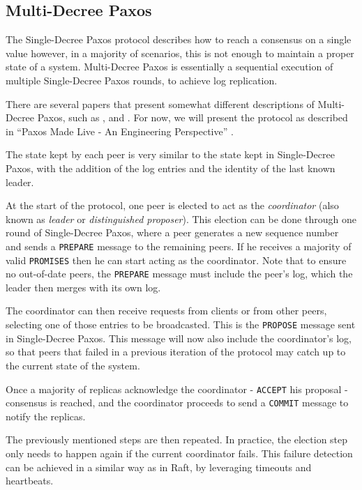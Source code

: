 \subsection{Multi-Decree Paxos}

The Single-Decree Paxos protocol describes how to reach a consensus on a single value however, in a majority of scenarios, this is not enough to maintain a proper state of a system. Multi-Decree Paxos is essentially a sequential execution of multiple Single-Decree Paxos rounds, to achieve log replication. 

There are several papers that present somewhat different descriptions of Multi-Decree Paxos, such as \cite{paxos_complex}, \cite{paxos_live} and \cite{paxos_vs_raft}. For now, we will present the protocol as described in “Paxos Made Live - An Engineering Perspective” \cite{paxos_live}.

The state kept by each peer is very similar to the state kept in Single-Decree Paxos, with the addition of the log entries and the identity of the last known leader.

At the start of the protocol, one peer is elected to act as the \textit{coordinator} (also known as \textit{leader} or \textit{distinguished proposer}). This election can be done through one round of Single-Decree Paxos, where a peer generates a new sequence number and sends a \texttt{PREPARE} message to the remaining peers. If he receives a majority of valid \texttt{PROMISES} then he can start acting as the coordinator. Note that to ensure no out-of-date peers, the \texttt{PREPARE} message must include the peer’s log, which the leader then merges with its own log.

The coordinator can then receive requests from clients or from other peers, selecting one of those entries to be broadcasted. This is the \texttt{PROPOSE} message sent in Single-Decree Paxos. This message will now also include the coordinator’s log, so that peers that failed in a previous iteration of the protocol may catch up to the current state of the system.

Once a majority of replicas acknowledge the coordinator - \texttt{ACCEPT} his proposal - consensus is reached, and the coordinator proceeds to send a \texttt{COMMIT} message to notify the replicas.

\vspace{0.5cm}

The previously mentioned steps are then repeated. In practice, the election step only needs to happen again if the current coordinator fails. This failure detection can be achieved in a similar way as in Raft, by leveraging timeouts and heartbeats.

